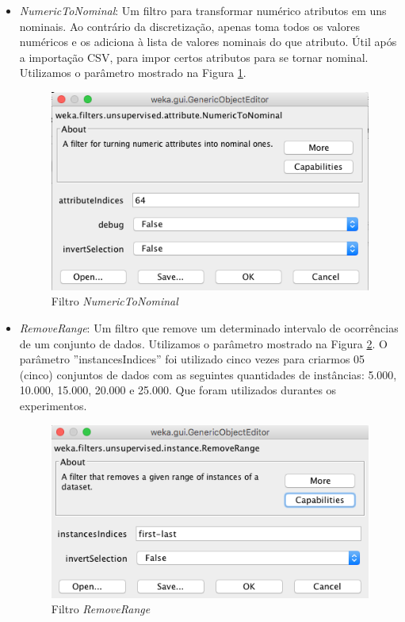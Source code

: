 \documentclass[
	12pt,				%
	openright,			%
	oneside,	
	a4paper,				%
	english,				%
	brazil				%
]{abntex2/abntex2} %
\begin{document}
\begin{itemize}
			\item \textit{NumericToNominal}: Um filtro para transformar numérico atributos em uns nominais. Ao contrário da discretização, apenas toma todos os valores numéricos e os adiciona à lista de valores nominais do que atributo. Útil após a importação CSV, para impor certos atributos para se tornar nominal. Utilizamos o parâmetro mostrado na Figura \ref{figfiltroNumericToNominal}.
			\begin{figure}[!h]
				\caption{\label{figfiltroNumericToNominal} Filtro \textit{NumericToNominal}}
				\begin{center}
					\includegraphics[scale=0.45]{img/filtroNumericToNominal.png}
				\end{center}
			\end{figure}
			\newpage
			\item \textit{RemoveRange}: Um filtro que remove um determinado intervalo de ocorrências de um conjunto de dados. Utilizamos o parâmetro mostrado na Figura \ref{figfiltroRemoveRange}. O parâmetro ''instancesIndices''  foi utilizado cinco vezes para criarmos 05 (cinco) conjuntos de dados com as seguintes quantidades de instâncias: 5.000, 10.000, 15.000, 20.000 e 25.000. Que foram utilizados durantes os experimentos.
			\begin{figure}[!h]
					\caption{\label{figfiltroRemoveRange} Filtro \textit{RemoveRange}}
				\begin{center}
					\includegraphics[scale=0.45]{img/filtroRemoveRange.png}

\end{center}
\end{figure}
\end{itemize}
\end{document}
